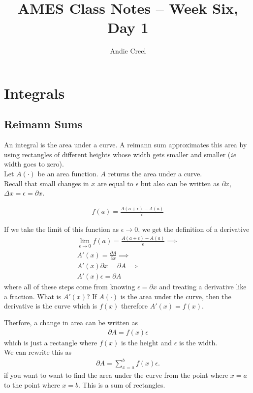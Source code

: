 \documentclass{article}
\title{AMES Class Notes -- Week Six, Day 1}
\author{Andie Creel}
\begin{document}
\maketitle

\section{Integrals}

\subsection{Reimann Sums}
An integral is the area under a curve. A reimann sum approximates this area by using rectangles of different heights whose width gets smaller and smaller (\textit{ie} width goes to zero).\\

Let $A(\cdot)$ be an area function. $A$ returns the area under a curve. \\

Recall that small changes in $x$ are equal to $\epsilon$ but also can be written as $\partial x$, $\Delta x = \epsilon = \partial x$.

\begin{align}
    f(a) = \frac{A(a+\epsilon)-A(a)}{\epsilon}
\end{align}

If we take the limit of this function as $\epsilon \to 0$, we get the definition of a derivative 
\begin{align}
    \lim_{\epsilon \to 0} f(a) = \frac{A(a+\epsilon)-A(a)}{\epsilon} \implies\\
    A'(x) = \frac{\partial A}{\partial x} \implies \\
    A'(x) \partial x = \partial A \implies \\
    A'(x) \epsilon = \partial A 
\end{align}
where all of these steps come from knowing $\epsilon = \partial x$ and treating a derivative like a fraction. What is $A'(x)$? If $A(\cdot)$ is the area under the curve, then the derivative is the curve which is $f(x)$ therefore $A'(x) = f(x)$. 

Therfore, a change in area can be written as
\begin{align}
    \partial A = f(x) \epsilon
\end{align}
which is just a rectangle where $f(x)$ is the height and $\epsilon$ is the width. \\

We can rewrite this as 
\begin{align}
    \partial A =  \sum_{x=a}^{b}f(x) \epsilon.
\end{align}
if you want to want to find the area under the curve from the point where $x =a $ to the point where $x = b$. This is a sum of rectangles. \\
\end{document}
